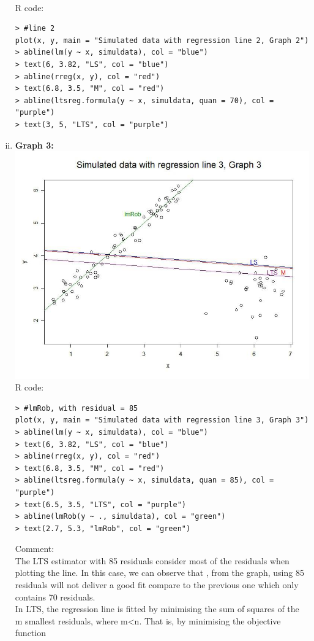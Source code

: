 \documentclass[a4paper,11pt]{article}
\begin{document}
\begin{enumerate}[i)]
\\R code:
\begin{verbatim}
> #line 2
plot(x, y, main = "Simulated data with regression line 2, Graph 2")
> abline(lm(y ~ x, simuldata), col = "blue")
> text(6, 3.82, "LS", col = "blue")
> abline(rreg(x, y), col = "red")
> text(6.8, 3.5, "M", col = "red")
> abline(ltsreg.formula(y ~ x, simuldata, quan = 70), col = "purple")
> text(3, 5, "LTS", col = "purple")
\end{verbatim}
\newpage
\item {\bf Graph 3:}\\
\includegraphics[scale=0.5]{g3.jpg}\\
R code:
\begin{verbatim}
> #lmRob, with residual = 85
plot(x, y, main = "Simulated data with regression line 3, Graph 3")
> abline(lm(y ~ x, simuldata), col = "blue")
> text(6, 3.82, "LS", col = "blue")
> abline(rreg(x, y), col = "red")
> text(6.8, 3.5, "M", col = "red")
> abline(ltsreg.formula(y ~ x, simuldata, quan = 85), col = "purple")
> text(6.5, 3.5, "LTS", col = "purple")
> abline(lmRob(y ~ ., simuldata), col = "green")
> text(2.7, 5.3, "lmRob", col = "green")
\end{verbatim}
Comment: \\
The LTS estimator with 85 residuals consider most of the residuals when plotting the line. In this case, we can observe that , from the graph, using 85 residuals will not  deliver a good fit compare to the previous one which only contains 70 residuals.\\
In LTS, the regression line is fitted by minimising the sum of squares of the m smallest residuals, where m<n. That is, by minimising the objective function

\end{enumerate}
\end{document}

